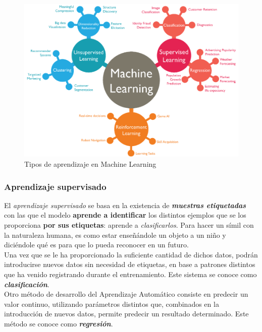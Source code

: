 \begin{figure}[h]
    \centering
    \includegraphics[scale=0.5]{cap2_contextualizacion/images/ml_learning.png}
    \caption{Tipos de aprendizaje en Machine Learning \cite{chugh2008mltypes}}
    \label{fig:ml_tipos_aprendizaje}
\end{figure}


\subsubsection{Aprendizaje supervisado}

El \textit{aprendizaje supervisado} se basa en la existencia de \textbf{\textit{muestras etiquetadas}} con las que el modelo \textbf{aprende a identificar} los distintos ejemplos que se los proporciona \textbf{por sus etiquetas}: aprende a \textit{clasificarlos}. Para hacer un símil con la naturaleza humana, es como estar enseñándole un objeto a un niño  y diciéndole qué es para que lo pueda reconocer en un futuro. \\

Una vez que se le ha proporcionado la suficiente cantidad de dichos datos, podrán introducirse nuevos datos sin necesidad de etiquetas, en base a patrones distintos que ha venido registrando durante el entrenamiento. Este sistema se conoce como \textbf{\textit{clasificación}}. \\

Otro método de desarrollo del Aprendizaje Automático consiste en predecir un valor continuo, utilizando parámetros distintos que, combinados en la introducción de nuevos datos, permite predecir un resultado determinado. Este método se conoce como \textbf{\textit{regresión}}. \\

